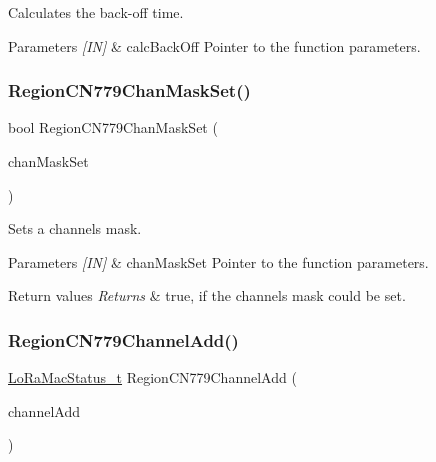 Calculates the back-\/off time. 


\begin{DoxyParams}{Parameters}
{\em \mbox{[}\+I\+N\mbox{]}} & calc\+Back\+Off Pointer to the function parameters. \\
\hline
\end{DoxyParams}
\mbox{\label{group__REGIONCN779_ga06c5fe5ebbc02741394fb573944467b7}} 
\subsubsection{\texorpdfstring{Region\+C\+N779\+Chan\+Mask\+Set()}{RegionCN779ChanMaskSet()}}
{\footnotesize\ttfamily bool Region\+C\+N779\+Chan\+Mask\+Set (\begin{DoxyParamCaption}\item[{\hyperlink{group__REGION_ga6d24f7da136006410827dfb29f6b9b9e}{Chan\+Mask\+Set\+Params\+\_\+t} $\ast$}]{chan\+Mask\+Set }\end{DoxyParamCaption})}



Sets a channels mask. 


\begin{DoxyParams}{Parameters}
{\em \mbox{[}\+I\+N\mbox{]}} & chan\+Mask\+Set Pointer to the function parameters.\\
\hline
\end{DoxyParams}

\begin{DoxyRetVals}{Return values}
{\em Returns} & true, if the channels mask could be set. \\
\hline
\end{DoxyRetVals}
\mbox{\label{group__REGIONCN779_ga087a9e4729bae8b825db62caca5f20d2}} 
\subsubsection{\texorpdfstring{Region\+C\+N779\+Channel\+Add()}{RegionCN779ChannelAdd()}}
{\footnotesize\ttfamily \hyperlink{group__LORAMAC_ga30bd25657e10480f8605ee951b0ecfbd}{Lo\+Ra\+Mac\+Status\+\_\+t} Region\+C\+N779\+Channel\+Add (\begin{DoxyParamCaption}\item[{\hyperlink{group__REGION_gab1c5f3aa06614283202906cef4417860}{Channel\+Add\+Params\+\_\+t} $\ast$}]{channel\+Add }\end{DoxyParamCaption})}



